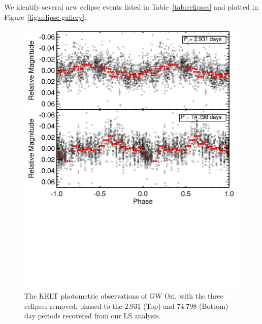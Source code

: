 \documentclass[twocolumn]{aastex61}
\begin{document}
We identify several new eclipse events listed in Table~\ref{tab:eclipses} and plotted in Figure~\ref{fig:eclipse-gallery}.

\begin{figure}[!ht]
\centering\includegraphics[width=0.99\linewidth, trim = 0 3.5in 0 0]{Figure_Phased.pdf}
\caption{The KELT photometric observations of GW Ori, with the three eclipses removed, phased to the 2.931 (Top) and 74.798 (Bottom) day periods recovered from our LS analysis. }%
\label{fig:phased}
\end{figure}
\end{document}

